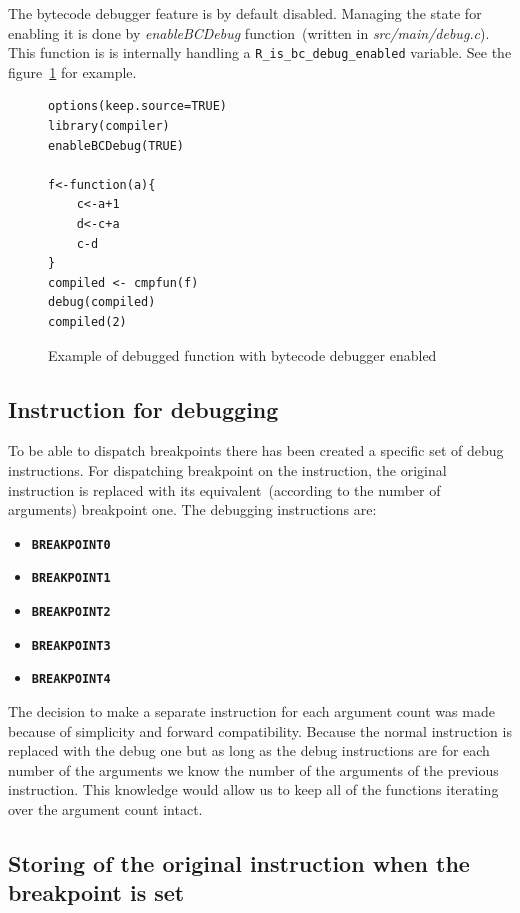 \documentclass[thesis=M,english]{FITthesis}[2018/10/20]
\newcommand{\code}[1]{\texttt{#1}}
\begin{document}
The bytecode debugger feature is by default disabled. Managing the state for enabling it is done by \textit{enableBCDebug} function~(written in \textit{src/main/debug.c}). This function is is internally handling a \code{R{\_}is{\_}bc{\_}debug{\_}enabled} variable. See the figure~\ref{fig:debugged-bcdebug-enabled} for example.

\begin{figure}[H]
\begin{lstlisting}
options(keep.source=TRUE)
library(compiler)
enableBCDebug(TRUE)

f<-function(a){
    c<-a+1
    d<-c+a
    c-d
}
compiled <- cmpfun(f)
debug(compiled)
compiled(2)
\end{lstlisting}
	\caption{Example of debugged function with bytecode debugger enabled}\label{fig:debugged-bcdebug-enabled}
\end{figure}

\subsection{Instruction for debugging}\label{instruction-for-debugging}

To be able to dispatch breakpoints there has been created a specific set of debug instructions. For dispatching breakpoint on the instruction, the original instruction is replaced with its equivalent~(according to the number of arguments) breakpoint one. The debugging instructions are:

\begin{itemize}
	\item \textbf{\code{BREAKPOINT0}}
	\item \textbf{\code{BREAKPOINT1}}
	\item \textbf{\code{BREAKPOINT2}}
	\item \textbf{\code{BREAKPOINT3}}
	\item \textbf{\code{BREAKPOINT4}}
\end{itemize}

The decision to make a separate instruction for each argument count was made because of simplicity and forward compatibility. Because the normal instruction is replaced with the debug one but as long as the debug instructions are for each number of the arguments we know the number of the arguments of the previous instruction. This knowledge would allow us to keep all of the functions iterating over the argument count intact.

\subsection{Storing of the original instruction when the breakpoint is set}\label{storing-original-instructions}
\end{document}
